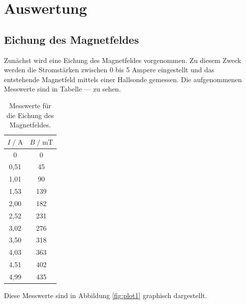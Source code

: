\section{Auswertung}
\label{sec:Auswertung}

\subsection{Eichung des Magnetfeldes}

Zunächst wird eine Eichung des Magnetfeldes vorgenommen. Zu diesem Zweck werden die Stromstärken zwischen 0 bis 5 Ampere eingestellt 
und das entstehende Magnetfeld mittels einer Hallsonde gemessen. Die aufgenommenen Messwerte sind in Tabelle --- zu sehen. 

\begin{table}[H]
    \centering
    \caption{Messwerte für die Eichung des Magnetfeldes.}
    \label{tab:mess1}
    \begin{tabular}{c c}
    \toprule
    $I \;/\; \si{\ampere}$ & $B \;/\; \si{\milli\tesla}$ \\
    \midrule
        0 & 0\\
        0,51 & 45\\
        1,01 & 90\\
        1,53 & 139\\
        2,00 & 182\\
        2,52 & 231\\
        3,02 & 276\\
        3,50 & 318\\
        4,03 & 363\\
        4,51 & 402\\
        4,99 & 435\\
    \bottomrule
    \end{tabular}
  \end{table}
  
  Diese Messwerte sind in Abbildung \ref{fig:plot1} graphisch dargestellt. 
  
